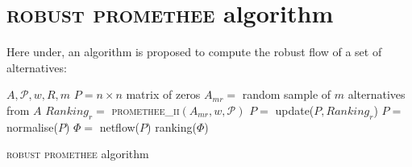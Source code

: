\chapter{\textsc{robust promethee} algorithm} \label{app:rob_promethee_algorithm}

Here under, an algorithm is proposed to compute the robust flow of a set of alternatives:
\begin{algorithm}[H]
\begin{algorithmic}[1]
    \REQUIRE $A, \mathcal{P}, w, R, m$ 
    \STATE $P = n\times n$ matrix of zeros
        \STATE $A_{mr} =$ random sample of $m$ alternatives from $A$
        \STATE $Ranking_{r}=$ \textsc{promethee\_ii}$(A_{mr}, w, \mathcal{P})$
        \STATE $P=$ update($P, Ranking_{r}$) \label{alg:line_update}
    \ENDFOR
    \STATE $P=$ normalise($P$) \label{alg:line_normalise}
    \STATE $\Phi =$ netflow($P$)
    \RETURN ranking($\Phi$)
\end{algorithmic}
\caption{\textsc{robust promethee} algorithm}
\label{alg:robust_pii}
\end{algorithm}



